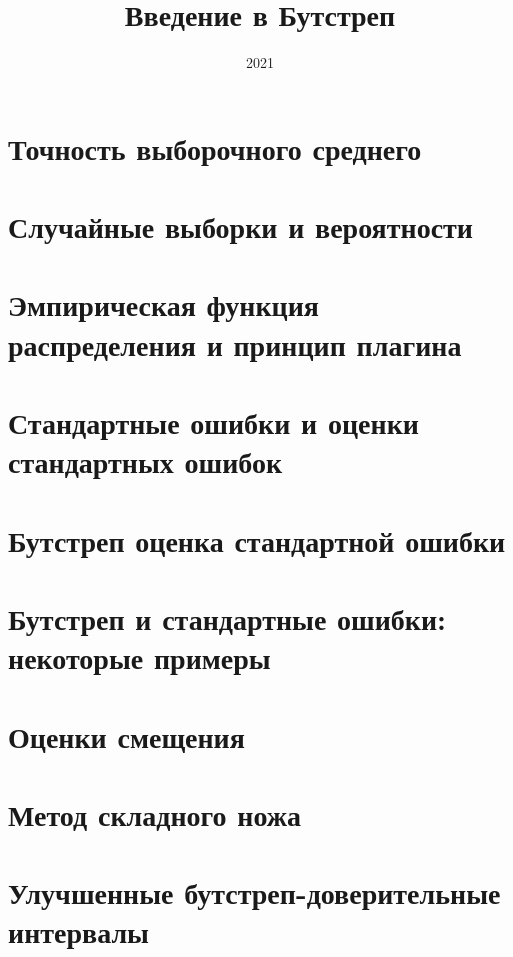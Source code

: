 \documentclass[12pt,a4paper,final]{report}
\title{Введение в Бутстреп}
\date{2021}
\begin{document}
\maketitle

\tableofcontents

\chapter{Точность выборочного среднего }


\chapter{Случайные выборки и вероятности}




\chapter{Эмпирическая функция распределения и принцип плагина}




\chapter{Стандартные ошибки и оценки стандартных ошибок}




\chapter{Бутстреп оценка стандартной ошибки}






\chapter{Бутстреп и стандартные ошибки: некоторые примеры}





\setcounter{chapter}{9}
\chapter{Оценки смещения}







\chapter{Метод складного ножа}








\setcounter{chapter}{13}
\chapter{Улучшенные бутстреп-доверительные интервалы}





\end{document}
